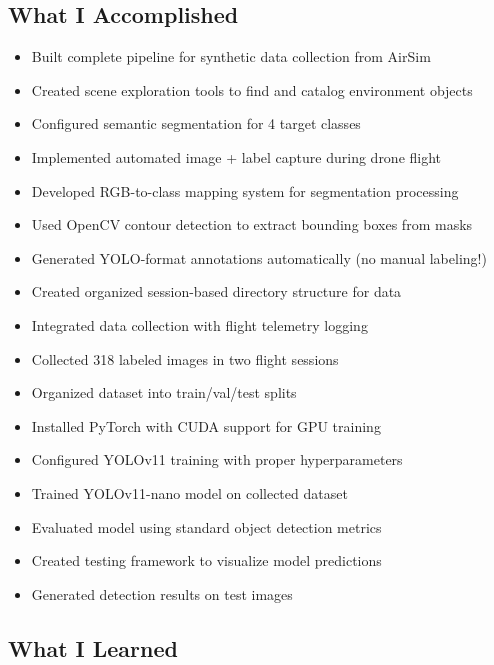 \clearpage

\subsection{What I Accomplished}

\begin{itemize}
	\item Built complete pipeline for synthetic data collection from AirSim
	\item Created scene exploration tools to find and catalog environment objects
	\item Configured semantic segmentation for 4 target classes
	\item Implemented automated image + label capture during drone flight
	\item Developed RGB-to-class mapping system for segmentation processing
	\item Used OpenCV contour detection to extract bounding boxes from masks
	\item Generated YOLO-format annotations automatically (no manual labeling!)
	\item Created organized session-based directory structure for data
	\item Integrated data collection with flight telemetry logging
	\item Collected 318 labeled images in two flight sessions
	\item Organized dataset into train/val/test splits
	\item Installed PyTorch with CUDA support for GPU training
	\item Configured YOLOv11 training with proper hyperparameters
	\item Trained YOLOv11-nano model on collected dataset
	\item Evaluated model using standard object detection metrics
	\item Created testing framework to visualize model predictions
	\item Generated detection results on test images
\end{itemize}

\subsection{What I Learned}


